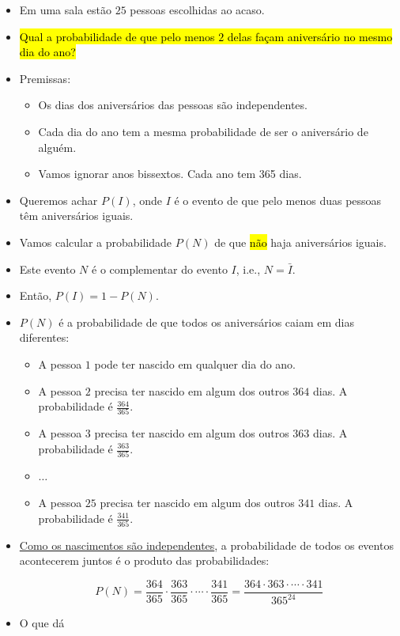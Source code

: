\documentclass[
  11pt]{report}
\begin{document}
\begin{itemize}
\item
  Em uma sala estão $25$ pessoas escolhidas ao acaso.
\item
  {\hl{Qual a probabilidade de que pelo menos $2$ delas façam aniversário no mesmo dia do ano?}}
\item
  Premissas:

  \begin{itemize}
  \item
    Os dias dos aniversários das pessoas são independentes.
  \item
    Cada dia do ano tem a mesma probabilidade de ser o aniversário de alguém.
  \item
    Vamos ignorar anos bissextos. Cada ano tem 365 dias.
  \end{itemize}
\item
  Queremos achar $P(I)$, onde $I$ é o evento de que pelo menos duas pessoas têm aniversários iguais.
\item
  Vamos calcular a probabilidade $P(N)$ de que {\hl{não}} haja aniversários iguais.
\item
  Este evento $N$ é o complementar do evento $I$, i.e., $N = \bar I$.
\item
  Então, $P(I) = 1 - P(N)$.
\item
  $P(N)$ é a probabilidade de que todos os aniversários caiam em dias diferentes:

  \begin{itemize}
  \item
    A pessoa $1$ pode ter nascido em qualquer dia do ano.
  \item
    A pessoa $2$ precisa ter nascido em algum dos outros $364$ dias. A probabilidade é $\frac{364}{365}$.
  \item
    A pessoa $3$ precisa ter nascido em algum dos outros $363$ dias. A probabilidade é $\frac{363}{365}$.
  \item
    $\ldots$
  \item
    A pessoa $25$ precisa ter nascido em algum dos outros $341$ dias. A probabilidade é $\frac{341}{365}$.
  \end{itemize}
\item
  \protect\hyperlink{independentes-produto}{Como os nascimentos são independentes}, a probabilidade de todos os eventos acontecerem juntos é o produto das probabilidades:

  \[
  P(N) = \frac{364}{365} \cdot \frac{363}{365} \cdot \cdots \cdot
         \frac{341}{365}
       = \frac{364 \cdot 363 \cdot \cdots \cdot 341}{365^{24}}
  \]
\item
  O que dá


\end{itemize}
\end{document}
